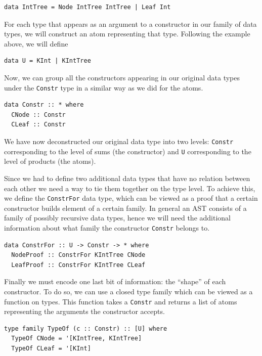 \documentclass[11pt, titlepage]{article}
\begin{document}
\begin{verbatim}
data IntTree = Node IntTree IntTree | Leaf Int
\end{verbatim}

For each type that appears as an argument to a constructor in our family
of data types, we will construct an atom representing that type.
Following the example above, we will define

\begin{verbatim}
data U = KInt | KIntTree 
\end{verbatim}

Now, we can group all the constructors appearing in our original
data types under the \texttt{Constr} type in a similar way as we
did for the atoms. 

\begin{verbatim}
data Constr :: * where
  CNode :: Constr
  CLeaf :: Constr
\end{verbatim}

We have now deconstructed our original data type into two levels: \texttt{Constr} corresponding to the level of sums (the constructor) 
and  \texttt{U} corresponding to the level of products (the atoms).

Since we had to define two additional data types that have no relation between 
each other we need a way to tie them together on the type level.
To achieve this, we define the \texttt{ConstrFor} data type,
which can be viewed as a proof that a certain constructor builds element
of a certain family. In general an AST consists of a family of possibly 
recursive data types, hence we will need the additional information about what 
family the constructor \texttt{Constr} belongs to.

\begin{verbatim}
data ConstrFor :: U -> Constr -> * where
  NodeProof :: ConstrFor KIntTree CNode
  LeafProof :: ConstrFor KIntTree CLeaf
\end{verbatim}

Finally we must encode one last bit of information: the ``shape'' of
each constructor. To do so, we can use a closed type family which can be
viewed as a function on types. This function takes a \texttt{Constr} and
returns a list of atoms representing the arguments the constructor
accepts.

\begin{verbatim}
type family TypeOf (c :: Constr) :: [U] where
  TypeOf CNode = '[KIntTree, KIntTree]
  TypeOf CLeaf = '[KInt]
\end{verbatim}
\end{document}
